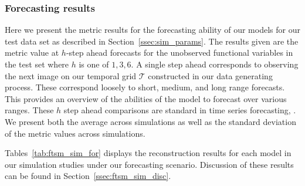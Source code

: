 \subsubsection{Forecasting results}
Here we present the metric results for the forecasting ability of our models for our test data set as described in Section~\ref{ssec:sim_params}.
The results given are the metric value at $h$-step ahead forecasts for the unobserved functional variables in the test set where $h$ is one of $1, 3, 6$.
A single step ahead corresponds to observing the next image on our temporal grid $\mathcal{T}$ constructed in our data generating process. 
These correspond loosely to short, medium, and long range forecasts. 
This provides an overview of the abilities of the model to forecast over various ranges.
These $h$ step ahead comparisons are standard in time series forecasting, \citep{hyndman_forecasting_2021}. 
We present both the average across simulations as well as the standard deviation of the metric values across simulations.

Tables~\ref{tab:ftsm_sim_for} displays the reconstruction results for each model in our simulation studies under our forecasting scenario. 
Discussion of these results can be found in Section~\ref{ssec:ftsm_sim_disc}. 

